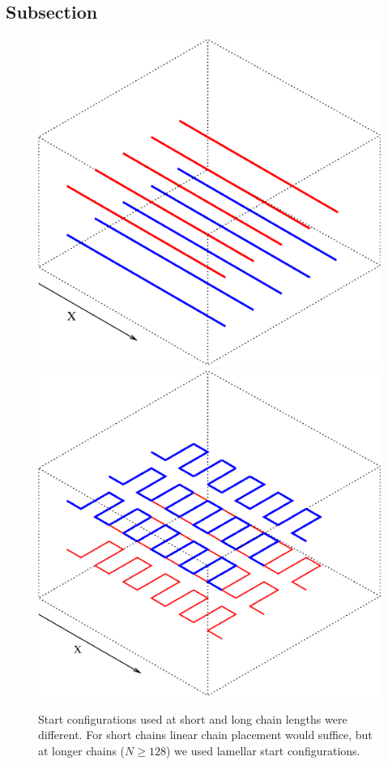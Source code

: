 \documentclass[10pt,aps,pre,raggedfooter,twocolumn,twoside,longbibliography,floatfix,superscriptaddress]{revtex4-1}
\begin{document}
\subsection{Subsection} \label{sec:tread}
\blindtext
\blindtext
\begin{figure}[b] %
\centering
 \includegraphics[scale=0.3]{linear.eps}
 \includegraphics[scale=0.3]{lamellar.eps}
 \caption{\label{config}Start configurations used at short and long chain lengths were different. For short chains linear chain placement would suffice, but at longer chains ($N\geq128$) we used lamellar start configurations.}
\end{figure}
\blindtext
\blindtext
\end{document}
